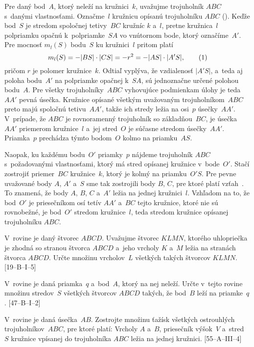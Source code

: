 {\ineriesenie
Pre daný bod~$A$, ktorý neleží na kružnici~$k$, uvažujme
trojuholník $ABC$ s~danými vlastnosťami. Označme~$l$ kružnicu
opísanú trojuholníku $ABC$ (\obr). Keďže bod~$S$ je stredom
spoločnej tetivy~$BC$ kružníc $k$ a~$l$, pretne kružnica~$l$
polpriamku opačnú k~polpriamke~$SA$ vo vnútornom bode, ktorý
označíme~$A'$. Pre mocnosť $m_l(S)$ bodu~$S$ ku kružnici~$l$
pritom platí
$$
m_l(S)=-|BS|\cdot |CS|=-r^2=-|AS|\cdot |A'S|,
\tag1
$$
pričom $r$ je polomer kružnice~$k$. Odtiaľ vyplýva, že vzdialenosť
$|A'S|$, a~teda aj poloha bodu~$A'$ na polpriamke opačnej k~$SA$,
sú jednoznačne určené polohou bodu~$A$. Pre všetky
trojuholníky~$ABC$ vyhovujúce podmienkam úlohy je teda $AA'$ pevná
úsečka. Kružnice opísané všetkým uvažovaným trojuholníkom~$ABC$ preto
majú spoločnú tetivu~$AA'$, takže ich stredy ležia na osi~$p$
úsečky~$AA'$. V~prípade, že $ABC$ je rovnoramenný trojuholník so
základňou~$BC$, je úsečka~$AA'$ priemerom kružnice~$l$ a~jej
stred~$O$ je súčasne stredom úsečky~$AA'$. Priamka~$p$ prechádza
týmto bodom~$O$ kolmo na priamku~$AS$.

\inspicture{}

Naopak, ku každému bodu~$O'$ priamky~$p$ nájdeme trojuholník $ABC$
s~požadovanými vlastnosťami, ktorý má stred opísanej kružnice v~bode~$O'$.
Stačí zostrojiť priemer~$BC$ kružnice~$k$, ktorý je kolmý
na priamku~$O'S$. Pre pevne uvažované body $A$, $A'$ a~$S$ sme tak
zostrojili body $B$, $C$, pre ktoré platí vzťah~. To znamená,
že body $A$, $B$, $C$ a~$A'$ ležia na jednej kružnici~$l$.
Vzhľadom na to, že bod~$O'$ je priesečníkom osí tetív $AA'$ a~$BC$
tejto kružnice, ktoré nie sú rovnobežné, je bod~$O'$ stredom
kružnice~$l$, teda stredom kružnice opísanej trojuholníku $ABC$.

V~rovine je daný štvorec $ABCD$. Uvažujme štvorec
  $KLMN$, ktorého uhlopriečka je zhodná so stranou štvorca $ABCD$
  a~jeho vrcholy $K$ a~$M$ ležia na stranách štvorca $ABCD$. Určte
  množinu vrcholov~$L$ všetkých takých štvorcov $KLMN$.
  [19--B--I--5]

V~rovine je daná priamka~$q$ a~bod~$A$, ktorý na nej neleží.
  Určte v~tejto rovine množinu stredov~$S$ všetkých štvorcov $ABCD$
  takých, že bod~$B$ leží na priamke~$q$. [47--B--I--2]

V~rovine je daná úsečka~$AB$. Zostrojte množinu ťažísk všetkých
  ostrouhlých trojuholníkov~$ABC$, pre ktoré platí: Vrcholy $A$ a~$B$,
  priesečník výšok~$V$ a~stred~$S$ kružnice vpísanej do trojuholníka $ABC$
  ležia na jednej kružnici. [55--A--III--4]

}

